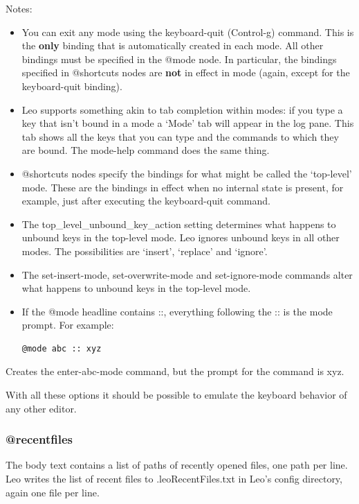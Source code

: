 \documentclass[a4paper,10pt,english]{sphinxmanual}
\begin{document}
Notes:
\begin{itemize}
\item {} 
You can exit any mode using the keyboard-quit (Control-g) command. This is the
\textbf{only} binding that is automatically created in each mode. All other bindings
must be specified in the @mode node. In particular, the bindings specified in
@shortcuts nodes are \textbf{not} in effect in mode (again, except for the
keyboard-quit binding).

\item {} 
Leo supports something akin to tab completion within modes: if you type a key
that isn't bound in a mode a `Mode' tab will appear in the log pane. This tab
shows all the keys that you can type and the commands to which they are bound.
The mode-help command does the same thing.

\item {} 
@shortcuts nodes specify the bindings for what might be called the `top-level'
mode. These are the bindings in effect when no internal state is present, for
example, just after executing the keyboard-quit command.

\item {} 
The top\_level\_unbound\_key\_action setting determines what happens to
unbound keys in the top-level mode. Leo ignores unbound keys in all other modes.
The possibilities are `insert', `replace' and `ignore'.

\item {} 
The set-insert-mode, set-overwrite-mode and set-ignore-mode
commands alter what happens to unbound keys in the top-level mode.

\item {} 
If the @mode headline contains ::, everything following
the :: is the mode prompt. For example:

\begin{Verbatim}[commandchars=\\\{\}]
@mode abc :: xyz
\end{Verbatim}

\end{itemize}

Creates the enter-abc-mode command, but the prompt for the command is xyz.

With all these options it should be possible to emulate the keyboard behavior of any other editor.


\subsubsection{@recentfiles}
\label{customizing:recentfiles}
The body text contains a list of paths of recently opened files, one path per
line. Leo writes the list of recent files to .leoRecentFiles.txt in Leo's
config directory, again one file per line.
\end{document}
